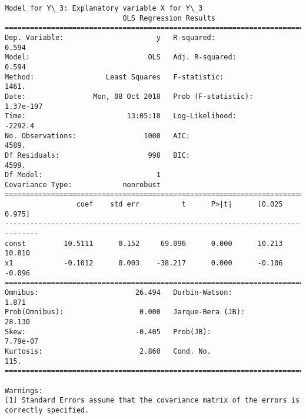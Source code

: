 \documentclass[11pt]{article}
\begin{document}
\begin{Verbatim}[commandchars=\\\{\}]
Model for Y\_3: Explanatory variable X for Y\_3
                            OLS Regression Results                            
==============================================================================
Dep. Variable:                      y   R-squared:                       0.594
Model:                            OLS   Adj. R-squared:                  0.594
Method:                 Least Squares   F-statistic:                     1461.
Date:                Mon, 08 Oct 2018   Prob (F-statistic):          1.37e-197
Time:                        13:05:18   Log-Likelihood:                -2292.4
No. Observations:                1000   AIC:                             4589.
Df Residuals:                     998   BIC:                             4599.
Df Model:                           1                                         
Covariance Type:            nonrobust                                         
==============================================================================
                 coef    std err          t      P>|t|      [0.025      0.975]
------------------------------------------------------------------------------
const         10.5111      0.152     69.096      0.000      10.213      10.810
x1            -0.1012      0.003    -38.217      0.000      -0.106      -0.096
==============================================================================
Omnibus:                       26.494   Durbin-Watson:                   1.871
Prob(Omnibus):                  0.000   Jarque-Bera (JB):               28.130
Skew:                          -0.405   Prob(JB):                     7.79e-07
Kurtosis:                       2.860   Cond. No.                         115.
==============================================================================

Warnings:
[1] Standard Errors assume that the covariance matrix of the errors is correctly specified.



\end{Verbatim}
\end{document}
